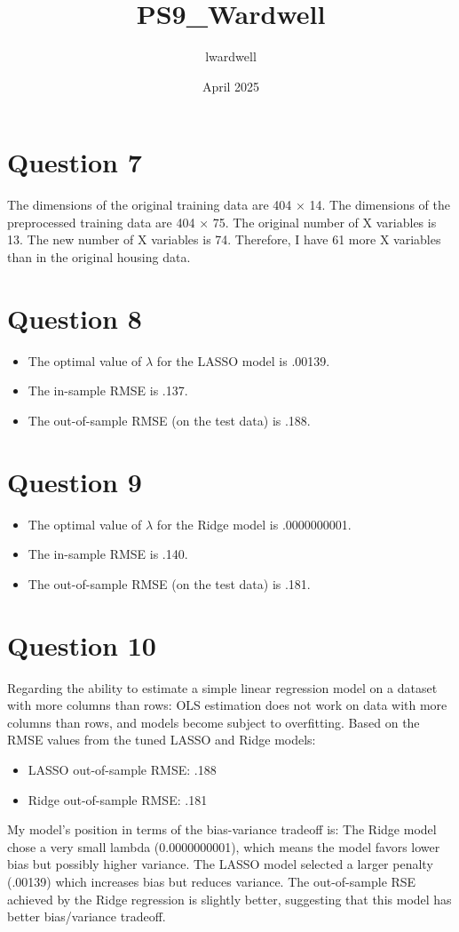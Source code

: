 \documentclass{article}
\title{PS9\_Wardwell}
\author{lwardwell }
\date{April 2025}
\begin{document}
\maketitle

\section*{Question 7}

The dimensions of the original training data are 404 × 14.
The dimensions of the preprocessed training data are 404 × 75.
The original number of X variables is 13.
The new number of X variables is 74.
Therefore, I have 61 more X variables than in the original housing data.
\section*{Question 8}
\begin{itemize}
\item The optimal value of $\lambda$ for the LASSO model is .00139.
\item The in-sample RMSE is .137.
\item The out-of-sample RMSE (on the test data) is .188.
\end{itemize}
\section*{Question 9}
\begin{itemize}
\item The optimal value of $\lambda$ for the Ridge model is .0000000001.
\item The in-sample RMSE is .140.
\item The out-of-sample RMSE (on the test data) is .181.
\end{itemize}
\section*{Question 10}
Regarding the ability to estimate a simple linear regression model on a dataset with more columns than rows:
OLS estimation does not work on data with more columns than rows, and models become subject to overfitting. 
Based on the RMSE values from the tuned LASSO and Ridge models:
\begin{itemize}
\item LASSO out-of-sample RMSE: .188
\item Ridge out-of-sample RMSE: .181
\end{itemize}
My model's position in terms of the bias-variance tradeoff is:
The Ridge model chose a very small lambda (0.0000000001), which means the model favors lower bias but possibly higher variance. The LASSO model selected a larger penalty (.00139) which increases bias but reduces variance. 
The out-of-sample RSE achieved by the Ridge regression is slightly better, suggesting that this model has better bias/variance tradeoff.
\end{document}
